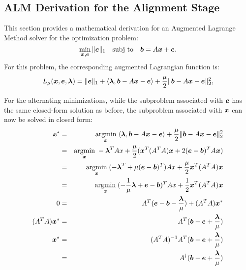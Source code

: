 \subsection{ALM Derivation for the Alignment Stage}
This section provides a mathematical derivation for an Augmented Lagrange Method solver
for the optimization problem:
\begin{equation}
\min_{\x, \e} \|\e\|_1 \quad \subj \quad \bb =
A \x + \e.
\end{equation}
For this problem, the corresponding augmented Lagrangian function is:
\begin{equation}
L_\mu (\x,\e,\blambda) = \|\e\|_1 + \langle \blambda, \bb-A\x - \e \rangle + \frac{\mu}{2} \|\bb - A\x - \e\|_2^2,
\end{equation}

For the alternating minimizations, while the subproblem associated with $\e$
has the same closed-form solution as before, the subproblem associated with
$\x$ can now be solved in closed form:
\begin{eqnarray}\small
\x^* &=& \argmin{\x} \langle \blambda, \bb-A\x - \e \rangle + \frac{\mu}{2} \|\bb - A\x - \e\|_2^2 \\
 &=& \argmin{\x} -\blambda^T A x + \frac{\mu}{2} (\x^T(A^T A) \x + 2(\e-\bb)^T A \x) \\
 &=& \argmin{\x} (-\blambda^T + \mu (\e - \bb)^T) A x + \frac{\mu}{2} \x^T (A^T A) \x \\
 &=& \argmin{\x} (-\frac{1}{\mu}\blambda + \e - \bb)^T A x + \frac{1}{2} \x^T (A^T A) \x \\
0 &=& A^T(\e - \bb -\frac{\blambda}{\mu}) + (A^T A) \x^*\\
(A^T A) \x^* &=&  A^T (\bb - \e + \frac{\blambda}{\mu})\\
\x^* &=&  (A^T A)^{-1} A^T (\bb - \e + \frac{\blambda}{\mu})\\
&=&  A^\dagger (\bb - \e + \frac{\blambda}{\mu})
\end{eqnarray}

